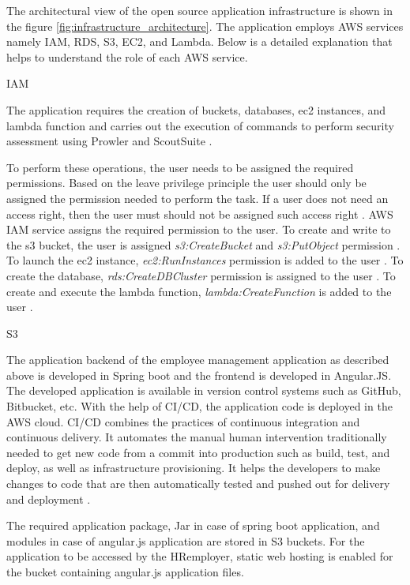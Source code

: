 \par The architectural view of the open source application infrastructure is shown in the figure
\ref{fig:infrastructure_architecture}.
The application employs AWS services namely IAM, RDS, S3, EC2, and Lambda.
Below is a detailed explanation that helps to understand the role of each AWS service.

\par IAM

\par The application requires the creation of buckets, databases, ec2 instances, and lambda function and carries out the
execution of commands to perform security assessment using Prowler and ScoutSuite \cite{70}.

\par To perform these operations, the user needs to be assigned the required permissions.
Based on the leave privilege principle the user should only be assigned the permission needed to perform the task.
If a user does not need an access right, then the user must should not be assigned such access right \cite{81}.
AWS IAM service assigns the required permission to the user.
To create and write to the s3 bucket, the user is assigned \textit{s3:CreateBucket} and \textit{s3:PutObject} permission \cite{82}.
To launch the ec2 instance, \textit{ec2:RunInstances} permission is added to the user \cite{83}.
To create the database, \textit{rds:CreateDBCluster} permission is assigned to the user \cite{85}.
To create and execute the lambda function, \textit{lambda:CreateFunction} is added to the user \cite{85}.
\hfill \break
\par S3

\par The application backend of the employee management application as described above is developed in Spring boot and the frontend is developed in Angular.JS. The developed application is available in version control systems such as GitHub, Bitbucket, etc.
With the help of CI/CD, the application code is deployed in the AWS cloud.
CI/CD combines the practices of continuous integration and continuous delivery.
It automates the manual human intervention traditionally needed to get new code from a commit into production such as build, test, and deploy, as well as infrastructure provisioning.
It helps the developers to make changes to code that are then automatically tested and pushed out for delivery and deployment \cite{71}.

\par The required application package, Jar in case of spring boot application, and modules in case of angular.js application are stored in S3 buckets.
For the application to be accessed by the HR\/employer, static web hosting is enabled for the bucket containing angular.js application files.


